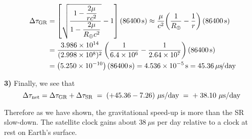 \documentclass[12pt]{article}
\begin{document}
\begin{enumerate}
  \[
  \begin{aligned}
  \Delta\tau_{\rm GR}
  &= \left[\sqrt{\frac{1-\dfrac{2\mu}{rc^2}}{1-\dfrac{2\mu}{R_\oplus c^2}}}-1\right](86400\,\mathrm{s})
  \approx \frac{\mu}{c^2}\!\left(\frac{1}{R_\oplus}-\frac{1}{r}\right)(86400\,\mathrm{s}) \\
  &= \frac{3.986\times10^{14}}{(2.998\times10^{8})^{2}}
    \left(\frac{1}{6.4\times10^{6}}-\frac{1}{2.64\times10^{7}}\right)
    (86400\,\mathrm{s}) \\
  &= \bigl(5.250\times10^{-10}\bigr)\,(86400\,\mathrm{s})
  = 4.536\times10^{-5}\,\mathrm{s}
  = 45.36\,\mu\mathrm{s}\!/\mathrm{day}
  \end{aligned}
  \]



  \medskip
  \textbf{3)}
  Finally, we see that
  \[
   \Delta\tau_{\rm net}=\Delta\tau_{\rm GR}+\Delta\tau_{\rm SR}
  \;=\;(+45.36-7.26)\ \mu\mathrm{s/day}
  \;=\;+\;38.10\ \mu\mathrm{s/day}\ 
  \]

  \noindent
  Therefore as we have shown, the gravitational speed-up is more than the SR slow-down. The satellite clock gains about $38\ \mu$s per day relative to a clock at rest on Earth’s surface.

\end{enumerate}
\newpage%
\end{document}
